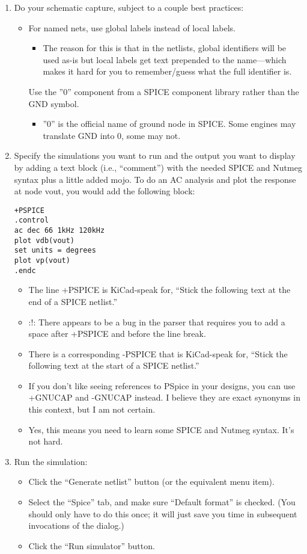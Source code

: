 \begin{enumerate}
  \item 
Do your schematic capture, subject to a couple best practices:
\begin{itemize}
  \item 
For named nets, use global labels instead of local labels.
\begin{itemize}
  \item 
The reason for this is that in the netlists, global identifiers will be used as-is but local labels get text prepended to the name—which makes it hard for you to remember/guess what the full identifier is.
\end{itemize}
Use the ”0” component from a SPICE component library rather than the GND symbol.
\begin{itemize}
  \item 
”0” is the official name of ground node in SPICE. Some engines may translate GND into 0, some may not.
\end{itemize}
\end{itemize}
  \item 
Specify the simulations you want to run and the output you want to display by
adding a text block (i.e., “comment”) with the needed SPICE and Nutmeg syntax
plus a little added mojo. To do an AC analysis and plot the response at node
vout, you would add the following block:
\begin{lstlisting}[style=SPICE]
+PSPICE 
.control
ac dec 66 1kHz 120kHz 
plot vdb(vout)
set units = degrees
plot vp(vout)
.endc
\end{lstlisting}
\begin{itemize}
  \item 
The line +PSPICE is KiCad-speak for, “Stick the following text at the end of a
SPICE netlist.”
  \item 
:!: There appears to be a bug in the parser that requires you to add a space
after +PSPICE and before the line break.
  \item 
There is a corresponding -PSPICE that is KiCad-speak for, “Stick the following
text at the start of a SPICE netlist.”
  \item 
If you don't like seeing references to PSpice in your designs, you can use
+GNUCAP and -GNUCAP instead. I believe they are exact synonyms in this context,
but I am not certain.
  \item 
Yes, this means you need to learn some SPICE and Nutmeg syntax. It's not hard.
\end{itemize}
  \item 
Run the simulation:
\begin{itemize}
  \item 
Click the “Generate netlist” button (or the equivalent menu item).
  \item 
Select the “Spice” tab, and make sure “Default format” is checked. (You should
only have to do this once; it will just save you time in subsequent invocations
of the dialog.)
  \item 
Click the “Run simulator” button.
\end{itemize}
\end{enumerate}

\secup
